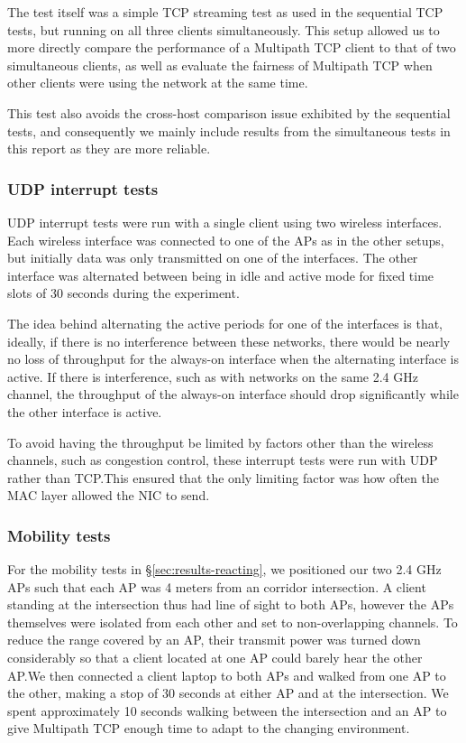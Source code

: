 The test itself was a simple TCP streaming test as used in the sequential TCP
tests, but running on all three clients simultaneously. This setup allowed
us to more directly compare the performance of a Multipath TCP client to that of
two simultaneous clients, as well as evaluate the fairness of Multipath TCP when
other clients were using the network at the same time.

This test also avoids the cross-host comparison issue exhibited by the
sequential tests, and consequently we mainly include results from the
simultaneous tests in this report as they are more reliable.

\subsubsection{UDP interrupt tests}
\label{sec:met:setups:intudp}
UDP interrupt tests were run with a single client using two
wireless interfaces. Each wireless interface was connected to one of the APs as
in the other setups, but initially data was only transmitted on one of the
interfaces.  The other interface was alternated between being in idle and active
mode for fixed time slots of 30 seconds during the experiment.

The idea behind alternating the active periods for one of the interfaces is
that, ideally, if there is no interference between these networks, there would
be nearly no loss of throughput for the always-on interface when the alternating
interface is active. If there is interference, such as with networks on the same
2.4 GHz channel, the throughput of the always-on interface should drop
significantly while the other interface is active.

To avoid having the throughput be limited by factors other than the wireless
channels, such as congestion control, these interrupt tests were run with UDP rather
than TCP.\@ This ensured that the only limiting factor was how
often the MAC layer allowed the NIC to send.

\subsubsection{Mobility tests}
\label{sec:met:setups:mobility}
For the mobility tests in \S\ref{sec:results-reacting}, we positioned our two
2.4 GHz APs such that each AP was 4 meters from an corridor intersection. 
A client standing at the intersection thus had line of sight to both 
APs, however the APs themselves were isolated from each other and set to non-overlapping 
channels. To reduce the range covered by an AP, their transmit power was 
turned down considerably so that a client 
located at one AP could barely hear the other AP.\@ We then connected a 
client laptop to both APs and walked from one AP to the other, making a stop of 
30 seconds at either AP and at the intersection. We spent approximately 10 
seconds walking between the intersection and an AP to give Multipath TCP
enough time to adapt to the changing environment.

